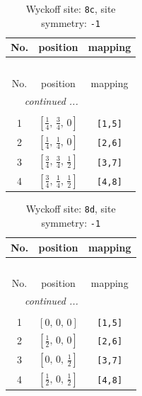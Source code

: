 \documentclass[fleqn,8pt]{jsarticle}
\begin{document}
\renewcommand{\arraystretch}{1.2}
\begin{longtable}{ccc}
\caption{Wyckoff site: {\tt 8c}, site symmetry: {\tt -1}}
 \\
 \hline \hline
No. & position & mapping \\ \hline \endfirsthead

\multicolumn{2}{l}{\tablename\ \thetable{}} \\
 \hline \hline
No. & position & mapping \\ \hline \endhead

 \hline \hline
\multicolumn{2}{r}{\footnotesize\it continued ...} \\ \endfoot

 \hline \hline
\multicolumn{2}{r}{} \\ \endlastfoot

1 & $\left[ \frac{1}{4},\, \frac{3}{4},\, 0 \right]$ & {\tt [1,5]} \\ \hline
2 & $\left[ \frac{1}{4},\, \frac{1}{4},\, 0 \right]$ & {\tt [2,6]} \\ \hline
3 & $\left[ \frac{3}{4},\, \frac{3}{4},\, \frac{1}{2} \right]$ & {\tt [3,7]} \\ \hline
4 & $\left[ \frac{3}{4},\, \frac{1}{4},\, \frac{1}{2} \right]$ & {\tt [4,8]} \\
\end{longtable}
\renewcommand{\arraystretch}{1.2}
\begin{longtable}{ccc}
\caption{Wyckoff site: {\tt 8d}, site symmetry: {\tt -1}}
 \\
 \hline \hline
No. & position & mapping \\ \hline \endfirsthead

\multicolumn{2}{l}{\tablename\ \thetable{}} \\
 \hline \hline
No. & position & mapping \\ \hline \endhead

 \hline \hline
\multicolumn{2}{r}{\footnotesize\it continued ...} \\ \endfoot

 \hline \hline
\multicolumn{2}{r}{} \\ \endlastfoot

1 & $\left[ 0,\, 0,\, 0 \right]$ & {\tt [1,5]} \\ \hline
2 & $\left[ \frac{1}{2},\, 0,\, 0 \right]$ & {\tt [2,6]} \\ \hline
3 & $\left[ 0,\, 0,\, \frac{1}{2} \right]$ & {\tt [3,7]} \\ \hline
4 & $\left[ \frac{1}{2},\, 0,\, \frac{1}{2} \right]$ & {\tt [4,8]} \\
\end{longtable}
\end{document}
